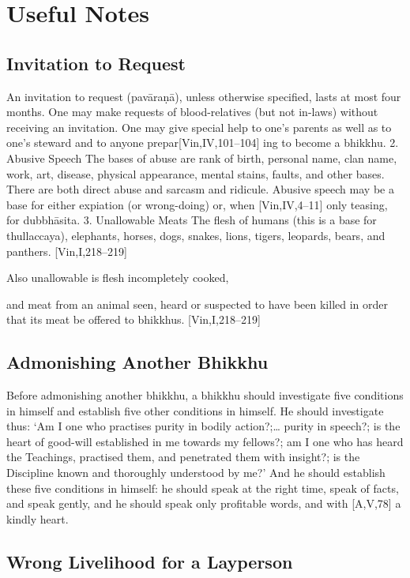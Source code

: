 \chapter{Useful Notes}

\section{Invitation to Request}

An invitation to request (pavāraṇā), unless
otherwise specified, lasts at most four months.
One may make requests of blood-relatives (but
not in-laws) without receiving an invitation.
One may give special help to one’s parents as
well as to one’s steward and to anyone prepar[Vin,IV,101–104]
ing to become a bhikkhu.
2. Abusive Speech
The bases of abuse are rank of birth, personal
name, clan name, work, art, disease, physical
appearance, mental stains, faults, and other
bases. There are both direct abuse and sarcasm
and ridicule. Abusive speech may be a base for
either expiation (or wrong-doing) or, when
[Vin,IV,4–11]
only teasing, for dubbhāsita.
3. Unallowable Meats
The flesh of humans (this is a base for thullaccaya), elephants, horses, dogs, snakes, lions,
tigers, leopards, bears, and panthers.
[Vin,I,218–219]

Also unallowable is flesh incompletely cooked,

and meat from an animal seen, heard or suspected to have been killed in order that its meat
be offered to bhikkhus.
[Vin,I,218–219]

\section{Admonishing Another Bhikkhu}

Before admonishing another bhikkhu, a
bhikkhu should investigate five conditions in
himself and establish five other conditions in
himself.
He should investigate thus: ‘Am I one who
practises purity in bodily action?;… purity in
speech?; is the heart of good-will established
in me towards my fellows?; am I one who has
heard the Teachings, practised them, and penetrated them with insight?; is the Discipline
known and thoroughly understood by me?’
And he should establish these five conditions
in himself: he should speak at the right time,
speak of facts, and speak gently, and he
should speak only profitable words, and with
[A,V,78]
a kindly heart.

\section{Wrong Livelihood for a Layperson}

